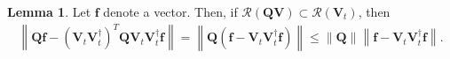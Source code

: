 \documentclass[preprint,10pt]{elsarticle}
\theoremstyle{definition}
\theoremstyle{lemma}
\newtheorem{lemma}{Lemma}
\theoremstyle{theorem}
\theoremstyle{assumption}
\newcommand{\diag}[1]{{\rm diag}\LRp{#1}}
\newcommand{\nor}[1]{\left\| #1 \right\|}
\newcommand{\LRp}[1]{\left( #1 \right)}
\begin{document}
\begin{lemma}
\label{thm:acc}
Let $\bm{f}$ denote a vector.  Then, if $\mathcal{R}\LRp{\bm{Q}\bm{V}} \subset \mathcal{R}\LRp{\bm{V}_t}$, then
\begin{align*}
\nor{\bm{Q}\bm{f} - \LRp{\bm{V}_t\bm{V}_t^{\dagger}}^T\bm{Q}\bm{V}_t\bm{V}_t^{\dagger}\bm{f}} = \nor{\bm{Q}\LRp{\bm{f}-\bm{V}_t\bm{V}_t^{\dagger}\bm{f}}} \leq \nor{\bm{Q}}\nor{\bm{f}-\bm{V}_t\bm{V}_t^{\dagger}\bm{f}}.
\end{align*}
\end{lemma}
\end{document}
